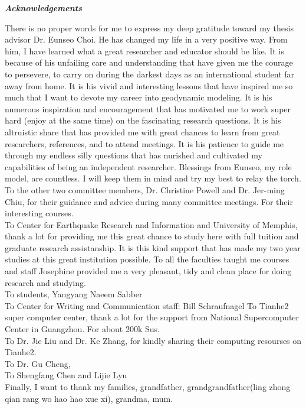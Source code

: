 \begin{center}
\textbf{\textit{Acknowledgements}}
\end{center}

There is no proper words for me to express my deep gratitude toward my thesis advisor Dr. Eunseo Choi. He has changed my life in a very positive way. From him, I have learned what a great researcher and educator should be like. It is because of his unfailing care and understanding that have given me the courage to persevere, to carry on during the darkest days as an international student far away from home. It is his vivid and interesting lessons that have inspired me so much that I want to devote my career into geodynamic modeling. It is his numerous inspiration and encouragement that has motivated me to work super hard (enjoy at the same time) on the fascinating research questions. It is his altruistic share that has provided me with great chances to learn from great researchers, references, and to attend meetings. It is his patience to guide me through my endless silly questions that has nurished and cultivated my capabilities of being an independent researcher. Blessings from Eunseo, my role model, are countless. I will keep them in mind and try my best to relay the torch.
\\
To the other two committee members, Dr. Christine Powell and Dr. Jer-ming Chiu, for their guidance and advice during many committee meetings. For their interesting courses.
\\
To Center for Earthquake Research and Information and University of Memphis, thank a lot for providing me this great chance to study here with full tuition and graduate research assistanship. It is this kind support that has made my two year studies at this great institution possible. To all the faculties taught me courses and staff Josephine provided me a very pleasant, tidy and clean place for doing research and studying. 
\\
To students,
Yangyang
Naeem
Sabber
\\
To Center for Writing and Communication staff: Bill Schraufnagel
To Tianhe2 super computer center, thank a lot for the support from National Supercomputer Center in Guangzhou. For about 200k Sus.
\\
To Dr. Jie Liu and Dr. Ke Zhang, for kindly sharing their computing resourses on Tianhe2.
\\
To Dr. Gu Cheng,
\\
To Shengfang Chen and Lijie Lyu 
\\
Finally, I want to thank my families, grandfather, grandgrandfather(ling zhong qian rang wo hao hao xue xi), grandma, mum.
